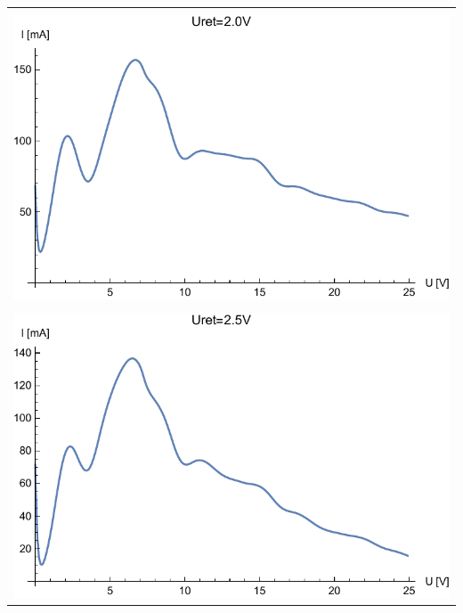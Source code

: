 \documentclass[paper=a4, fontsize=12pt]{scrartcl}
\begin{document}
\begin{tabular}{|c|}
	\hline\\
	\includegraphics[width=0.6\linewidth]{wyk2}
	\label{fig:wyk2}\\
	\hline\\
	\includegraphics[width=0.6\linewidth]{wyk3}
	\label{fig:wyk3}\\
	\hline
\end{tabular}
\end{document}
